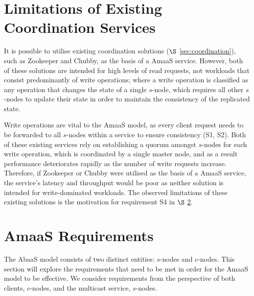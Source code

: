 \section{Limitations of Existing Coordination Services}\label{sec:limitations_existing_coordination}
It is possible to utilise existing coordination solutions ($\S$ \ref{sec:coordination}), such as Zookeeper\citep{Hunt:2010:ZWC:1855840.1855851} and Chubby\citep{Burrows:2006:CLS:1298455.1298487}, as the basis of a \textsf{AmaaS} service.  However, both of these solutions are intended for high levels of read requests, not workloads that consist predominantly of write operations; where a write operation is classified as any operation that changes the state of a single $s$-node, which requires all other $s$-nodes to update their state in order to maintain the consistency of the replicated state.  

Write operations are vital to the \textsf{AmaaS} model, as every client request needs to be forwarded to all $s$-nodes within a service to ensure consistency (S1, S2).  Both of these existing services rely on establishing a quorum amongst $s$-nodes for each write operation, which is coordinated by a single master node, and as a result performance deteriorates rapidly as the number of write requests increase.  Therefore, if Zookeeper or Chubby were utilised as the basis of a \textsf{AmaaS} service, the service's latency and throughput would be poor as neither solution is intended for write-dominated workloads.  The observed limitations of these existing solutions is the motivation for requirement S4 in $\S$ \ref{sec:absaas_requirements}.  	
	
\section{AmaaS Requirements}\label{sec:absaas_requirements}
The \textsf{AbaaS} model consists of two distinct entities: $s$-nodes and $c$-nodes.  This section will explore the requirements that need to be met in order for the \textsf{AmaaS} model to be effective.  We consider requirements from the perspective of both clients, $c$-nodes, and the multicast service, $s$-nodes.

